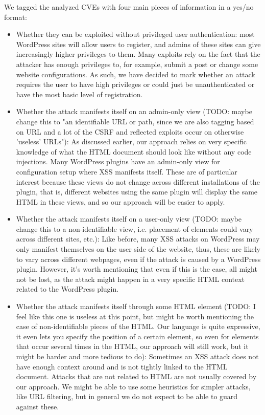 We tagged the analyzed CVEs with four main pieces of information in a yes/no format:
\begin{itemize}
	\item Whether they can be exploited without privileged user authentication: most WordPress sites will allow users to register, and admins of these sites can give increasingly higher privileges to them. Many exploits rely on the fact that the attacker has enough privileges to, for example, submit a post or change some website configurations. As such, we have decided to mark whether an attack requires the user to have high privileges or could just be unauthenticated or have the most basic level of registration. 
	\item Whether the attack manifests itself on an admin-only view (TODO: maybe change this to "an identifiable URL or path, since we are also tagging based on URL and a lot of the CSRF and reflected exploits occur on otherwise 'useless' URLs"): As discussed earlier, our approach relies on very specific knowledge of what the HTML document should look like without any code injections. Many WordPress plugins have an admin-only view for configuration setup where XSS manifests itself. These are of particular interest because these views do not change across different installations of the plugin, that is, different websites using the same plugin will display the same HTML in these views, and so our approach will be easier to apply.
	\item Whether the attack manifests itself on a user-only view (TODO: maybe change this to a non-identifiable view, i.e. placement of elements could vary across different sites, etc.): Like before, many XSS attacks on WordPress may only manifest themselves on the user side of the website, thus, these are likely to vary across different webpages, even if the attack is caused by a WordPress plugin. However, it's worth mentioning that even if this is the case, all might not be lost, as the attack might happen in a very specific HTML context related to the WordPress plugin.
	\item Whether the attack manifests itself through some HTML element (TODO: I feel like this one is useless at this point, but might be worth mentioning the case of non-identifiable pieces of the HTML. Our language is quite expressive, it even lets you specify the position of a certain element, so even for elements that occur several times in the HTML, our approach will still work, but it might be harder and more tedious to do): Sometimes an XSS attack does not have enough context around and is not tightly linked to the HTML document. Attacks that are not related to HTML are not usually covered by our approach. We might be able to use some heuristics for simpler attacks, like URL filtering, but in general we do not expect to be able to guard against these.
\end{itemize}

